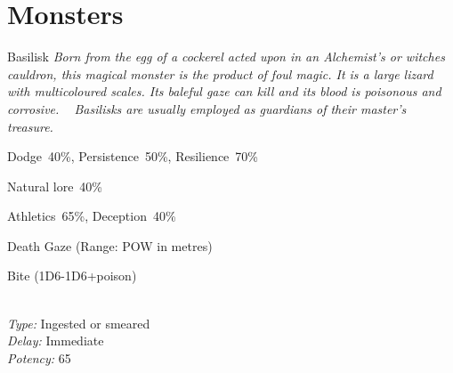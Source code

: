 \clearpage

\section{Monsters}


\begin{monsterbox}{Basilisk}
	\textit{Born from the egg of a cockerel acted upon in an Alchemist’s or witches cauldron, this magical monster is the product of foul magic. It is a large lizard with multicoloured scales. Its baleful gaze can kill and its blood is poisonous and corrosive.   Basilisks are usually employed as guardians of their master’s treasure.}\\
	\rpghline
	\basics[%
        hitpoints  = 8, %
	majorwound = 4,
	damagemodifier = -1D6,
	powerpoints = 16,
	movementrate = 15m,
	armor = Armor Scales (2AP),
	plunderrating = 5
	]
	\rpghline%
	\stats[ %
		STR = 2D3   (4),
		CON = 2D6+6 (13),
		DEX = 3D6   (11),
		SIZ = 1D3   (2),
		INT = 3     (3),
		POW = 1D6+12 (16),
		CHA = 3     (3)
	]
	\rpghline%
	\begin{rpg-monsteraction}[Resistances]
		Dodge~40\%, Persistence~50\%, Resilience~70\%
	\end{rpg-monsteraction}
	\begin{rpg-monsteraction}[Knowledge]
    		Natural lore~40\%
	\end{rpg-monsteraction}
	\begin{rpg-monsteraction}[Practical]
		Athletics~65\%, Deception~40\%
	\end{rpg-monsteraction}
	\begin{rpg-monsteraction}
		Death Gaze (Range: POW in metres)
	\end{rpg-monsteraction}
	\begin{rpg-monsteraction}
		Bite (1D6-1D6+poison)
	\end{rpg-monsteraction}
	\begin{rpg-monsteraction}\\
		\textit{Type:} Ingested or smeared\\
		\textit{Delay:} Immediate\\
		\textit{Potency:} 65\\

\end{rpg-monsteraction}
\end{monsterbox}
